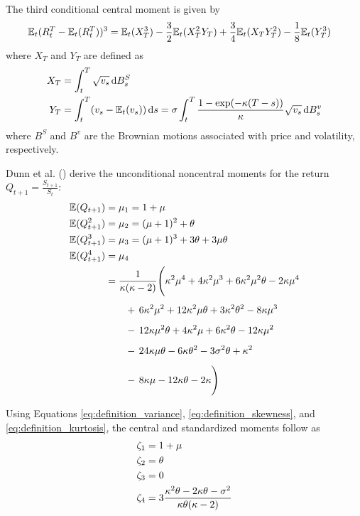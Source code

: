 The third conditional central moment is given by
\begin{align}
    \mathbb{E}_t(R_t^T-\mathbb{E}_t(R_t^T))^3 &= \mathbb{E}_t(X_T^3) - \frac{3}{2}\mathbb{E}_t(X_T^2Y_T) + \frac{3}{4}\mathbb{E}_t(X_TY_T^2) - \frac{1}{8}\mathbb{E}_t(Y_T^3) \notag
\end{align}
where $X_T$ and $Y_T$ are defined as
\begin{align}
    X_T &= \int_t^T \sqrt{v_s}\,\mathrm{d}B_s^S \notag \\
    Y_T &= \int_t^T (v_s - \mathbb{E}_t(v_s))\,\mathrm{d}s = \sigma\int_t^T\frac{1-\exp(-\kappa(T-s))}{\kappa}\sqrt{v_s}\,\mathrm{d}B_s^v \notag
\end{align}
where $B^S$ and $B^v$ are the Brownian motions associated with price and volatility, respectively.

Dunn et al. (\citeyear{dunnEstimatingOptionPrices2014}) derive the unconditional noncentral moments for the return $Q_{t+1}=\frac{S_{t+1}}{S_t}$:
\begin{align}
    \mathbb{E}(Q_{t+1}) &= \mu_1 = 1+\mu  \notag \\
    \mathbb{E}(Q_{t+1}^2) &= \mu_2 = (\mu+1)^2+\theta \notag \\
    \mathbb{E}(Q_{t+1}^3) &= \mu_3 = (\mu+1)^3+3\theta+3\mu\theta \notag \\
    \mathbb{E}(Q_{t+1}^4) &= \mu_4 \notag \\
    &=\frac{1}{\kappa(\kappa-2)}\Biggl(
        \kappa^2\mu^4 + 4\kappa^2\mu^3 + 6\kappa^2\mu^2\theta - 2\kappa\mu^4 \notag\\[1ex]
    &\quad\quad +\, 6\kappa^2\mu^2 + 12\kappa^2\mu\theta + 3\kappa^2\theta^2 - 8\kappa\mu^3 \notag\\[1ex]
    &\quad\quad -\, 12\kappa\mu^2\theta + 4\kappa^2\mu + 6\kappa^2\theta - 12\kappa\mu^2 \notag\\[1ex]
    &\quad\quad -\, 24\kappa\mu\theta - 6\kappa\theta^2 - 3\sigma^2\theta + \kappa^2 \notag\\[1ex]
    &\quad\quad -\, 8\kappa\mu - 12\kappa\theta - 2\kappa
    \Biggr) \notag
\end{align}
    
Using Equations \eqref{eq:definition_variance}, \eqref{eq:definition_skewness}, and \eqref{eq:definition_kurtosis}, the central and standardized moments follow as
\begin{align}
    \zeta_1 &= 1+\mu \notag \\
    \zeta_2 &= \theta \notag \\
    \zeta_3 &= 0 \notag \\
    \zeta_4 &= 3\frac{\kappa^2\theta - 2\kappa\theta - \sigma^2}{\kappa\theta(\kappa-2)} \notag
\end{align}